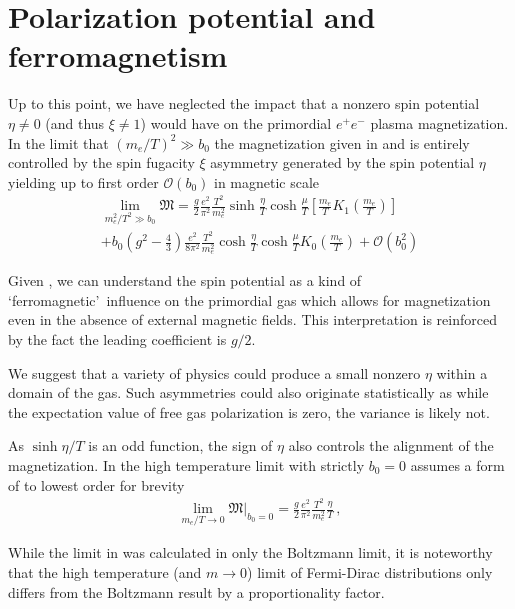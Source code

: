 \section{Polarization potential and ferromagnetism}
\label{sec:ferro}
\noindent Up to this point, we have neglected the impact that a nonzero spin potential $\eta\neq0$ (and thus $\xi\neq1$) would have on the primordial $e^{+}e^{-}$ plasma magnetization. In the limit that $(m_{e}/T)^2\gg b_0$ the magnetization given in  and  is entirely controlled by the spin fugacity $\xi$ asymmetry generated by the spin potential $\eta$ yielding up to first order $\mathcal{O}(b_{0})$ in magnetic scale
\begin{multline}
 \label{ferro}
 \lim_{m_{e}^{2}/T^{2}\gg b_0}{\mathfrak M}=\frac{g}{2}\frac{e^{2}}{\pi^{2}}\frac{T^{2}}{m_{e}^{2}}\sinh{\frac{\eta}{T}}\cosh{\frac{\mu}{T}}\left[\frac{m_{e}}{T}K_{1}\left(\frac{m_{e}}{T}\right)\right]\\
 +b_{0}\left(g^{2}-\frac{4}{3}\right)\frac{e^{2}}{8\pi^{2}}\frac{T^{2}}{m_{e}^{2}}\cosh{\frac{\eta}{T}}\cosh{\frac{\mu}{T}}K_{0}\left(\frac{m_{e}}{T}\right)
 +\mathcal{O}\left(b_{0}^{2}\right)
\end{multline}

Given , we can understand the spin potential as a kind of \lq ferromagnetic\rq\ influence on the primordial gas which allows for magnetization even in the absence of external magnetic fields. This interpretation is reinforced by the fact the leading coefficient is $g/2$.

We suggest that a variety of physics could produce a small nonzero $\eta$ within a domain of the gas. Such asymmetries could also originate statistically as while the expectation value of free gas polarization is zero, the variance is likely not.

As $\sinh{\eta/T}$ is an odd function, the sign of $\eta$ also controls the alignment of the magnetization. In the high temperature limit  with strictly $b_{0}=0$ assumes a form of to lowest order for brevity
\begin{align}
 \label{hiTferro}
 \lim_{m_{e}/T\rightarrow0}{\mathfrak M}\vert_{b_{0}=0}=\frac{g}{2}\frac{e^{2}}{\pi^{2}}\frac{T^{2}}{m_{e}^{2}}\frac{\eta}{T}\,,
\end{align}

While the limit in  was calculated in only the Boltzmann limit, it is noteworthy that the high temperature (and $m\rightarrow0$) limit of Fermi-Dirac distributions only differs from the Boltzmann result by a proportionality factor. 


